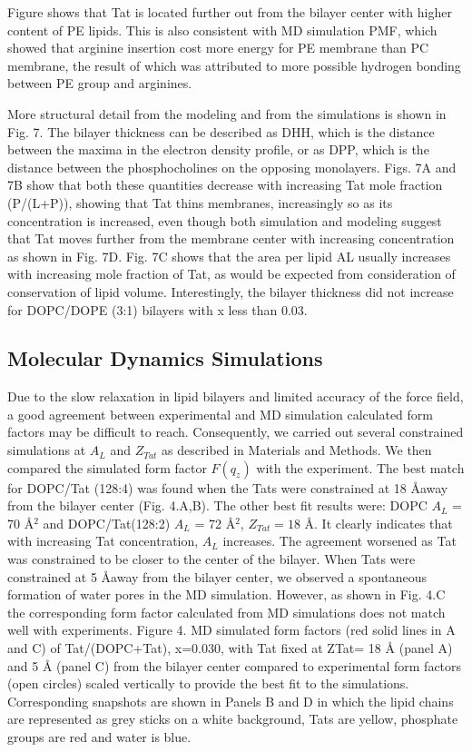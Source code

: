 Figure shows that Tat is located further out from the bilayer center with 
higher content of PE lipids. This is also consistent with MD simulation PMF,
which showed that arginine insertion cost more energy for PE membrane than
PC membrane, the result of which was attributed to more possible hydrogen 
bonding between PE group and arginines.

More structural detail from the modeling and from the simulations is shown in 
Fig. 7. The bilayer thickness can be described as DHH, which is the 
distance between the maxima in the electron density profile, or as DPP, which 
is the distance between the phosphocholines on the opposing monolayers. Figs. 
7A and 7B show that both these quantities decrease with increasing Tat mole 
fraction (P/(L+P)), showing that Tat thins membranes, increasingly so as its 
concentration is increased, even though both simulation and modeling suggest 
that Tat moves further from the membrane center with increasing concentration 
as shown in Fig. 7D.  Fig. 7C shows that the area per lipid AL usually increases 
with increasing mole fraction of Tat, as would be expected from consideration of 
conservation of lipid volume. Interestingly, the bilayer thickness did not 
increase for DOPC/DOPE (3:1) bilayers with x less than 0.03.  

\subsection{Molecular Dynamics Simulations}\label{sec:sim_results}
Due to the slow relaxation in lipid bilayers and limited accuracy of the force 
field, a good
agreement between experimental and MD simulation calculated form factors may 
be difficult to
reach. Consequently, we carried out several constrained simulations at $A_L$ 
and $Z_{Tat}$ as described
in Materials and Methods. We then compared the simulated form factor $F(q_z)$ 
with the
experiment. The best match for DOPC/Tat (128:4) was found when the Tats were 
constrained at 18 \AA away from the bilayer center (Fig. 4.A,B). The other 
best fit results were: DOPC $A_L$ = 70 \AA$^2$ and DOPC/Tat(128:2) $A_L$ = 72 
\AA$^2$, $Z_{Tat} = 18$ \AA. It clearly indicates that with increasing Tat
concentration, $A_L$ increases. The agreement worsened as Tat was constrained 
to be closer to the
center of the bilayer. When Tats were constrained at 5 \AA away from the bilayer 
center, we
observed a spontaneous formation of water pores in the MD simulation. However, 
as shown in
Fig. 4.C the corresponding form factor calculated from MD simulations does not 
match well
with experiments.
Figure 4. MD simulated form factors (red solid lines in A and C) of Tat/(DOPC+Tat), x=0.030,
with Tat fixed at ZTat= 18 Å (panel A) and 5 Å (panel C) from the bilayer center compared to
experimental form factors (open circles) scaled vertically to provide the best fit to the
simulations. Corresponding snapshots are shown in Panels B and D in which the lipid chains are
represented as grey sticks on a white background, Tats are yellow, phosphate groups are red and
water is blue.



